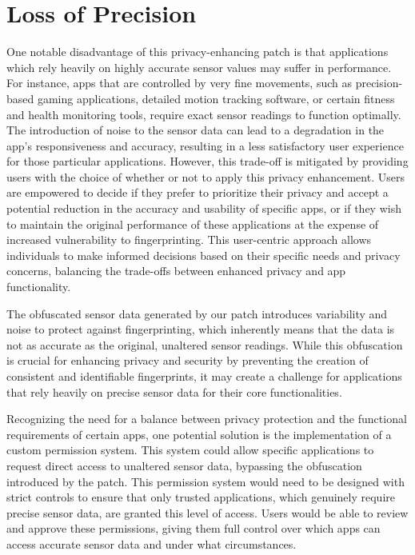 \documentclass[11pt,
  oneside,openany,    %
]{scrreprt}
\begin{document}
\section{Loss of Precision}
\label{sec:loss_of_precision}
One notable disadvantage of this privacy-enhancing patch is that applications which rely heavily on highly accurate sensor values may suffer in performance. For instance, apps that are controlled by very fine movements, such as precision-based gaming applications, detailed motion tracking software, or certain fitness and health monitoring tools, require exact sensor readings to function optimally. 
The introduction of noise to the sensor data can lead to a degradation in the app's responsiveness and accuracy, resulting in a less satisfactory user experience for those particular applications. However, this trade-off is mitigated by providing users with the choice of whether or not to apply this privacy enhancement.
Users are empowered to decide if they prefer to prioritize their privacy and accept a potential reduction in the accuracy and usability of specific apps, or if they wish to maintain the original performance of these applications at the expense of increased vulnerability to fingerprinting.
This user-centric approach allows individuals to make informed decisions based on their specific needs and privacy concerns, balancing the trade-offs between enhanced privacy and app functionality.

The obfuscated sensor data generated by our patch introduces variability and noise to protect against fingerprinting, which inherently means that the data is not as accurate as the original, unaltered sensor readings. 
While this obfuscation is crucial for enhancing privacy and security by preventing the creation of consistent and identifiable fingerprints, it may create a challenge for applications that rely heavily on precise sensor data for their core functionalities. 

Recognizing the need for a balance between privacy protection and the functional requirements of certain apps, one potential solution is the implementation of a custom permission system. 
This system could allow specific applications to request direct access to unaltered sensor data, bypassing the obfuscation introduced by the patch.
This permission system would need to be designed with strict controls to ensure that only trusted applications, which genuinely require precise sensor data, are granted this level of access. 
Users would be able to review and approve these permissions, giving them full control over which apps can access accurate sensor data and under what circumstances.
\end{document}
